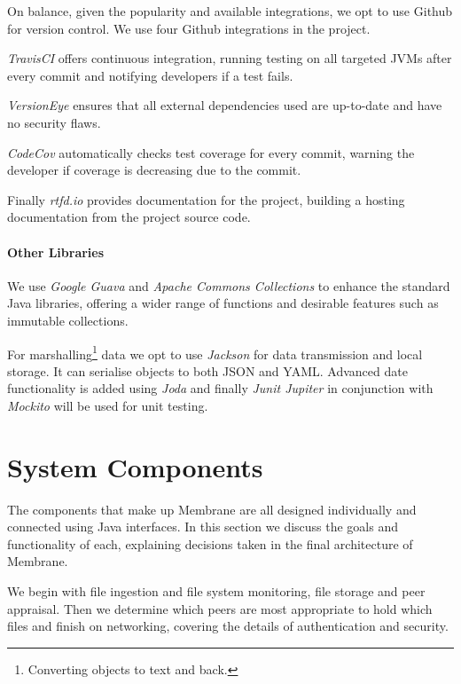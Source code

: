 \documentclass[11pt, a4paper, twoside]{report}
\begin{document}
On balance, given the popularity and available integrations, we opt to use Github for version control. We use four Github integrations in the project.

\emph{TravisCI} offers continuous integration, running testing on all targeted JVMs after every commit and notifying developers if a test fails.

\emph{VersionEye} ensures that all external dependencies used are up-to-date and have no security flaws.

\emph{CodeCov} automatically checks test coverage for every commit, warning the developer if coverage is decreasing due to the commit.

Finally \emph{rtfd.io} provides documentation for the project, building a hosting documentation from the project source code.

\subsubsection{Other Libraries}

We use \emph{Google Guava} and \emph{Apache Commons Collections} to enhance the standard Java libraries, offering a wider range of functions and desirable features such as immutable collections.

For marshalling\footnote{Converting objects to text and back.} data we opt to use \emph{Jackson} for data transmission and local storage. It can serialise objects to both JSON and YAML. Advanced date functionality is added using \emph{Joda} and finally \emph{Junit Jupiter} in conjunction with \emph{Mockito} will be used for unit testing.









\chapter{System Components}

The components that make up Membrane are all designed individually and connected using Java interfaces. In this section we discuss the goals and functionality of each, explaining decisions taken in the final architecture of Membrane.

We begin with file ingestion and file system monitoring, file storage and peer appraisal. Then we determine which peers are most appropriate to hold which files and finish on networking, covering the details of authentication and security.
\end{document}
